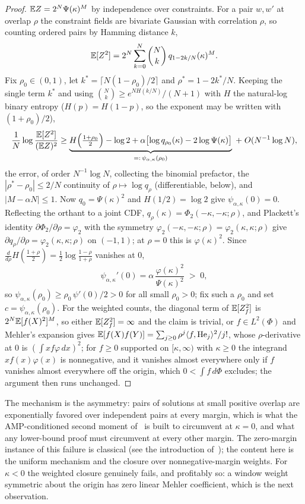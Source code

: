 \begin{proof}
$\mathbb{E} Z=2^N\Psi(\kappa)^M$ by independence over constraints.  For a
pair $w,w'$ at overlap $\rho$ the constraint fields are bivariate
Gaussian with correlation $\rho$, so counting ordered pairs by
Hamming distance $k$,
\[
\mathbb{E}[Z^2]=2^N\sum_{k=0}^N\binom Nk\,q_{1-2k/N}(\kappa)^M .
\]
Fix $\rho_0\in(0,1)$, let $k^*=\lceil N(1-\rho_0)/2\rceil$ and
$\rho^*=1-2k^*/N$.  Keeping the single term $k^*$ and using
$\binom Nk\ge e^{N H(k/N)}/(N+1)$ with $H$ the natural-log binary
entropy ($H(p)=H(1-p)$, so the exponent may be written with
$(1+\rho_0)/2$),
\[
\frac1N\log\frac{\mathbb{E}[Z^2]}{(\mathbb{E} Z)^2}
\ge\underbrace{H\Bigl(\tfrac{1+\rho_0}2\Bigr)-\log2
+\alpha\bigl[\log q_{\rho_0}(\kappa)-2\log\Psi(\kappa)\bigr]}
_{=:\,\psi_{\alpha,\kappa}(\rho_0)}\;+\;O(N^{-1}\log N),
\]
the error, of order $N^{-1}\log N$, collecting the binomial
prefactor, the $|\rho^*-\rho_0|\le
2/N$ continuity of $\rho\mapsto\log q_\rho$ (differentiable, below),
and $|M-\alpha N|\le1$.  Now $q_0=\Psi(\kappa)^2$ and $H(1/2)=\log2$
give $\psi_{\alpha,\kappa}(0)=0$.  Reflecting the orthant to a joint
CDF, $q_\rho(\kappa)=\Phi_2(-\kappa,-\kappa;\rho)$, and Plackett's
identity $\partial\Phi_2/\partial\rho=\varphi_2$ with the symmetry
$\varphi_2(-\kappa,-\kappa;\rho)=\varphi_2(\kappa,\kappa;\rho)$ give
$\partial q_\rho/\partial\rho=\varphi_2(\kappa,\kappa;\rho)$ on
$(-1,1)$; at $\rho=0$ this is $\varphi(\kappa)^2$.  Since
$\frac{d}{d\rho}H(\tfrac{1+\rho}2)=\tfrac12\log\tfrac{1-\rho}{1+\rho}$
vanishes at $0$,
\[
\psi_{\alpha,\kappa}'(0)=\alpha\,
\frac{\varphi(\kappa)^2}{\Psi(\kappa)^2}\;>\;0 ,
\]
so $\psi_{\alpha,\kappa}(\rho_0)\ge\rho_0\,\psi'(0)/2>0$ for all
small $\rho_0>0$; fix such a $\rho_0$ and set
$c=\psi_{\alpha,\kappa}(\rho_0)$.  For the weighted counts, the diagonal
term of $\mathbb{E}[Z_f^2]$ is $2^N\mathbb{E}[f(X)^2]^M$, so either
$\mathbb{E}[Z_f^2]=\infty$ and the claim is trivial, or $f\in L^2(\Phi)$ and
Mehler's expansion gives
$\mathbb{E}[f(X)f(Y)]=\sum_{j\ge0}\rho^j\langle f,\mathrm{He}_j\rangle^2/j!$,
whose $\rho$-derivative at $0$ is $(\int xf\varphi\,dx)^2$; for
$f\ge0$ supported on $[\kappa,\infty)$ with $\kappa\ge0$ the
integrand $xf(x)\varphi(x)$ is nonnegative, and it vanishes almost
everywhere only if $f$ vanishes almost everywhere off the origin,
which $0<\int f\,d\Phi$ excludes; the argument
then runs unchanged.
\end{proof}

The mechanism is the asymmetry: pairs of solutions at small positive
overlap are exponentially favored over independent pairs at every
margin, which is what the AMP-conditioned second moment
of~\cite{ding2019capacity} is built to circumvent at $\kappa=0$, and
what any lower-bound proof must circumvent at every other margin.
The zero-margin instance of this failure is classical
(see the introduction of~\cite{ding2019capacity}); the content here
is the uniform mechanism and the closure over nonnegative-margin
weights.  For $\kappa<0$ the weighted closure genuinely fails, and
profitably so: a window weight symmetric about the origin has zero
linear Mehler coefficient, which is the next observation.

